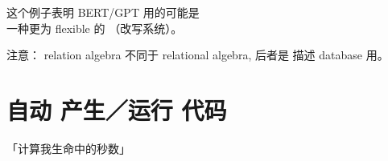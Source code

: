 这个例子表明 BERT/GPT 用的可能是 \\
一种更为 flexible 的 （改写系统）。 

{\footnotesize 注意： relation algebra 不同于 relational algebra, 后者是 描述 database 用。}

\section{自动 产生／运行 代码}

「计算我生命中的秒数」



